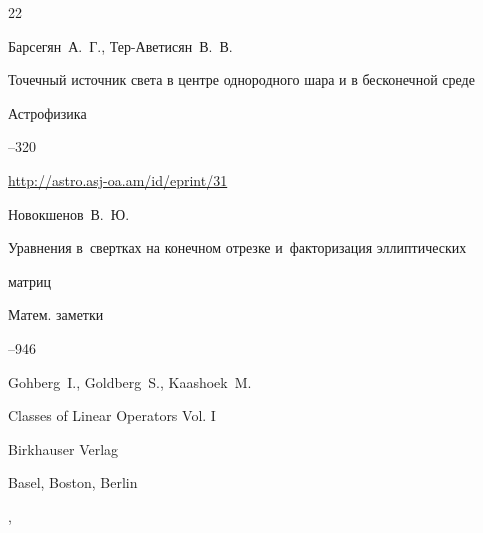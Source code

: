 \begin{thebibliography}{22}

\by Барсегян~А.~Г., Тер-Аветисян~В.~В.

\paper  Точечный источник света в центре однородного шара и в бесконечной среде

\jour Астрофизика




--320

\elink \url{http://astro.asj-oa.am/id/eprint/31}








\by Новокшенов~В.~Ю.

\paper Уравнения в~свертках на конечном отрезке и~факторизация эллиптических

матриц

\jour Матем. заметки




--946















\by Gohberg~I.,  Goldberg~S., Kaashoek~M.

\book Classes of Linear Operators Vol. I

\publ Birkhauser Verlag

\publaddr Basel, Boston, Berlin 

,


\end{thebibliography}
